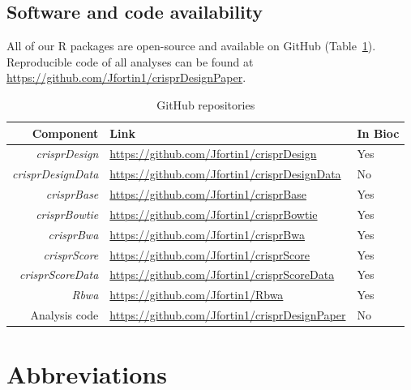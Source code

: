 \documentclass[pdftex,english,10pt]{article}
\begin{document}
{%
\subsection*{Software and code availability}

All of our R packages are open-source and available on GitHub (Table~\ref{tab:software}). 
Reproducible code of all analyses can be found at \url{https://github.com/Jfortin1/crisprDesignPaper}.


\begin{table}
\centering
\begin{tabular}{r|l|l}
Component &  Link  & In Bioc \\ \hline
\textit{crisprDesign} & \url{https://github.com/Jfortin1/crisprDesign}   & Yes \\
\textit{crisprDesignData} &  \url{https://github.com/Jfortin1/crisprDesignData}   & No \\
\textit{crisprBase} &  \url{https://github.com/Jfortin1/crisprBase}  & Yes \\
\textit{crisprBowtie} &  \url{https://github.com/Jfortin1/crisprBowtie} & Yes \\
\textit{crisprBwa} &  \url{https://github.com/Jfortin1/crisprBwa}  & Yes \\
\textit{crisprScore} &  \url{https://github.com/Jfortin1/crisprScore}  & Yes \\
\textit{crisprScoreData} &  \url{https://github.com/Jfortin1/crisprScoreData} & Yes \\
\textit{Rbwa} &  \url{https://github.com/Jfortin1/Rbwa}  & Yes \\
Analysis code &  \url{https://github.com/Jfortin1/crisprDesignPaper}   & No \\
\end{tabular}
\caption{GitHub repositories}
\label{tab:software}
\end{table}





\section*{Abbreviations}


}
\end{document}
